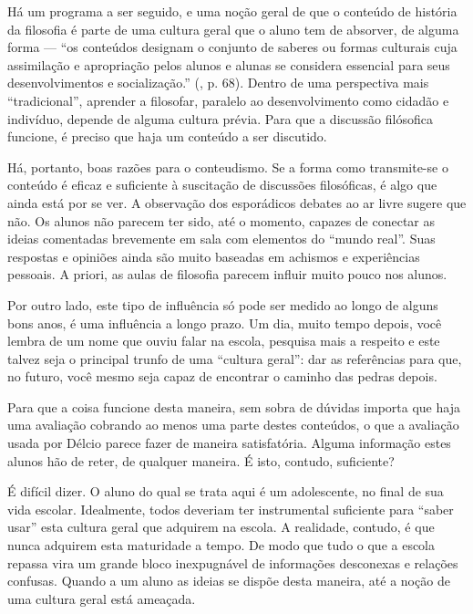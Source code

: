\documentclass[12pt,a4paper]{article}
\begin{document}
	Há um programa a ser seguido, e uma noção geral de que o conteúdo 
	de história da filosofia é parte de uma cultura geral que o aluno tem de 
	absorver, de alguma forma --- ``os conteúdos designam o conjunto de 
	saberes ou formas culturais cuja assimilação e apropriação pelos alunos e 
	alunas se considera essencial para seus desenvolvimentos e socialização.'' 
	(\cite{obiols}, p. 68). Dentro de uma perspectiva mais ``tradicional'', 
	aprender a filosofar, paralelo ao desenvolvimento como cidadão e 
	indivíduo, depende de alguma cultura prévia. Para que a discussão 
	filósofica funcione, é preciso que haja um conteúdo a ser discutido. 
	
	Há, portanto, boas razões para o conteudismo. Se a forma como transmite-se 
	o conteúdo é eficaz e suficiente à suscitação de discussões filosóficas, é 
	algo que ainda está por se ver. A observação dos esporádicos debates ao ar 
	livre sugere que não. Os alunos não parecem ter sido, até o momento, 
	capazes de conectar as ideias comentadas brevemente em sala com elementos 
	do ``mundo real''. Suas respostas e opiniões ainda são muito baseadas em 
	achismos e experiências pessoais. A priori, as aulas de filosofia parecem 
	influir muito pouco nos alunos. 
	
	Por outro lado, este tipo de influência só pode ser medido ao longo de 
	alguns bons anos, é uma influência a longo prazo. Um dia, muito tempo 
	depois, você lembra de um nome que ouviu falar na escola, pesquisa mais a 
	respeito 	e este talvez seja o principal trunfo de uma 
	``cultura geral'': dar as referências para que, no futuro, você mesmo seja 
	capaz de encontrar o caminho das pedras depois. 

	Para que a coisa funcione desta maneira, sem sobra de dúvidas importa que 
	haja uma avaliação cobrando ao menos uma parte destes conteúdos, o que a 
	avaliação usada por Délcio parece fazer de maneira satisfatória. Alguma 
	informação estes alunos hão de reter, de qualquer maneira. É isto, contudo, 
	suficiente? 
	
	É difícil dizer. O aluno do qual se trata aqui é um adolescente, no final 
	de sua vida escolar. Idealmente, todos deveriam ter instrumental 
	suficiente para ``saber usar'' esta cultura geral que adquirem na escola. 
	A realidade, contudo, é que nunca adquirem esta maturidade a tempo. De 
	modo que tudo o que a escola repassa vira um grande bloco inexpugnável de 
	informações desconexas e relações confusas. Quando a um aluno as ideias 
	se dispõe desta maneira, até a noção de uma cultura geral está ameaçada. 
	
\end{document}

